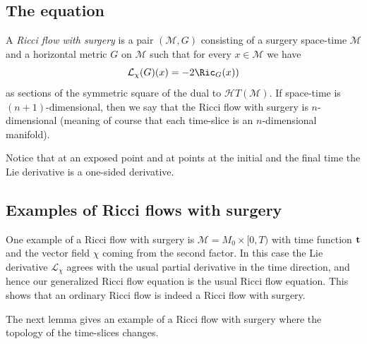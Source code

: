 \subsection{The equation}



\begin{definition}
\label{def:ricci-flow-with-surgery}
A {\em  Ricci flow with surgery} is a pair $({\mathcal M},G)$
consisting of a surgery space-time ${\mathcal M}$ and a horizontal
metric $G$ on ${\mathcal M}$ such that for every $x\in {\mathcal M}$
 we have
\begin{equation}\label{GRFEq}
{\mathcal L}_\chi(G)(x)=-2\Ric_G(x)) \end{equation} as sections
of the symmetric square of the dual to ${\mathcal HT}({\mathcal
M})$. If space-time is $(n+1)$-dimensional, then we say that the
Ricci flow with surgery is $n$-dimensional (meaning of course that
each time-slice is an $n$-dimensional manifold).
\end{definition}

\begin{remark}
\label{rem:one-sided-lie-derivative}
 Notice that at an exposed point and at points at the initial and the final time
   the Lie derivative is a one-sided derivative.
\end{remark}


\subsection{Examples of Ricci flows with surgery}

\begin{example}
\label{ex:ordinary-flow-as-surgery-flow}
One example of a Ricci flow with surgery is ${\mathcal M}=M_0\times
[0,T)$ with time function ${\bf t}$ and the vector field $\chi$
coming from the second factor. In this case the Lie derivative
${\mathcal L}_\chi$ agrees with the usual partial derivative in the
time direction, and hence our generalized Ricci flow equation is the
usual Ricci flow equation. This shows that an ordinary Ricci flow is indeed
a Ricci flow with surgery.
\end{example}

The next lemma gives an example of a  Ricci flow with surgery where
the topology of the time-slices changes.


